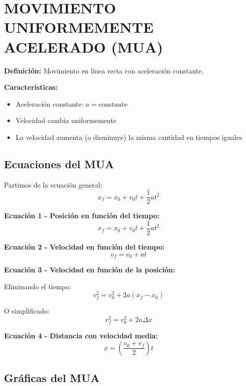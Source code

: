 \newpage

\section{MOVIMIENTO UNIFORMEMENTE ACELERADO (MUA)}

\begin{seccion}
\begin{definicion}
    \textbf{Definición:} Movimiento en línea recta con aceleración constante.
\end{definicion}

\vspace{0.3cm}

\textbf{Características:}
\begin{itemize}
    \item Aceleración constante: $a = \text{constante}$
    \item Velocidad cambia uniformemente
    \item La velocidad aumenta (o disminuye) la misma cantidad en tiempos iguales
\end{itemize}
\end{seccion}

\subsection{Ecuaciones del MUA}

\begin{ecuacion}
Partimos de la ecuación general:
$$x_f = x_0 + v_0 t + \frac{1}{2}at^2$$

\vspace{0.3cm}

\textbf{Ecuación 1 - Posición en función del tiempo:}
$$x_f = x_0 + v_0 t + \frac{1}{2}at^2$$

\textbf{Ecuación 2 - Velocidad en función del tiempo:}
$$v_f = v_0 + at$$

\textbf{Ecuación 3 - Velocidad en función de la posición:}

Eliminando el tiempo:
$$v_f^2 = v_0^2 + 2a(x_f - x_0)$$

O simplificado:
$$v_f^2 = v_0^2 + 2a\Delta x$$

\textbf{Ecuación 4 - Distancia con velocidad media:}
$$x = \left(\frac{v_0 + v_f}{2}\right) t$$
\end{ecuacion}

\newpage

\subsection{Gráficas del MUA}

